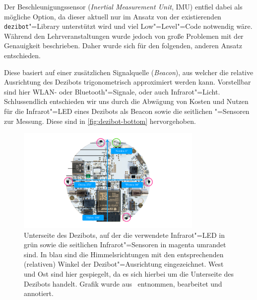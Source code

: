 Der Beschleunigungssensor (\emph{Inertial Measurement Unit}, IMU) entfiel dabei als mögliche Option, da dieser aktuell nur im Ansatz von der existierenden \texttt{dezibot}"=Library unterstützt wird und viel Low"=Level"=Code notwendig wäre. Während den Lehrveranstaltungen wurde jedoch von große Problemen mit der Genauigkeit beschrieben. Daher wurde sich für den folgenden, anderen Ansatz entschieden.

Diese basiert auf einer zusätzlichen Signalquelle (\emph{Beacon}), aus welcher die relative Ausrichtung des Dezibots trigonometrisch approximiert werden kann. Vorstellbar sind hier WLAN- oder Bluetooth"=Signale, oder auch Infrarot"=Licht. Schlussendlich entschieden wir uns durch die Abwägung von Kosten und Nutzen für die Infrarot"=LED eines Dezibots als Beacon sowie die seitlichen "=Sensoren zur Messung. Diese sind in \autoref{fig:dezibot-bottom} hervorgehoben.

\begin{figure}[h]
    \centering
    \includegraphics[width=0.8\textwidth]{../assets/dezibot_bottom.pdf}
    \caption{Unterseite des Dezibots, auf der die verwendete Infrarot"=LED in grün sowie die seitlichen Infrarot"=Sensoren in magenta umrandet sind. In blau sind die Himmelsrichtungen mit den entsprechenden (relativen) Winkel der Dezibot"=Ausrichtung eingezeichnet. West und Ost sind hier gespiegelt, da es sich hierbei um die Unterseite des Dezibots handelt. Grafik wurde aus~\cite{fingerleDokumentationDezibot42025} entnommen, bearbeitet und annotiert.}
    \label{fig:dezibot-bottom}
\end{figure}

